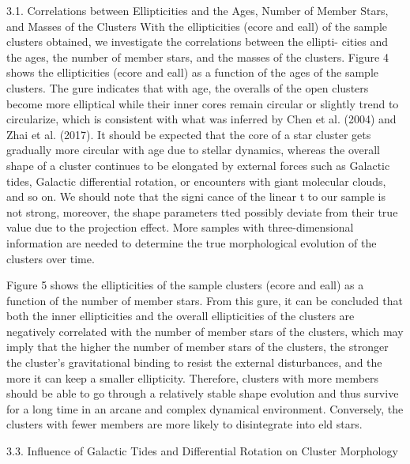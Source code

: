 \documentclass[../main.tex]{subfiles}
\begin{document}
{3.1. Correlations between Ellipticities and the Ages, Number of
Member Stars, and Masses of the Clusters
With the ellipticities (ecore and eall) of the sample clusters
obtained, we investigate the correlations between the ellipti-
cities and the ages, the number of member stars, and the masses
of the clusters. Figure 4 shows the ellipticities (ecore and eall) as
a function of the ages of the sample clusters. The gure
indicates that with age, the overalls of the open clusters become
more elliptical while their inner cores remain circular or
slightly trend to circularize, which is consistent with what was
inferred by Chen et al. (2004) and Zhai et al. (2017). It should
be expected that the core of a star cluster gets gradually more
circular with age due to stellar dynamics, whereas the overall
shape of a cluster continues to be elongated by external forces
such as Galactic tides, Galactic differential rotation, or
encounters with giant molecular clouds, and so on. We should
note that the signi cance of the linear t to our sample is not
strong, moreover, the shape parameters tted possibly deviate
from their true value due to the projection effect. More samples
with three-dimensional information are needed to determine the
true morphological evolution of the clusters over time.

Figure 5 shows the ellipticities of the sample clusters (ecore
and eall) as a function of the number of member stars. From this
gure, it can be concluded that both the inner ellipticities and
the overall ellipticities of the clusters are negatively correlated
with the number of member stars of the clusters, which may
imply that the higher the number of member stars of the
clusters, the stronger the cluster’s gravitational binding to resist
the external disturbances, and the more it can keep a smaller
ellipticity. Therefore, clusters with more members should be
able to go through a relatively stable shape evolution and thus
survive for a long time in an arcane and complex dynamical
environment. Conversely, the clusters with fewer members are
more likely to disintegrate into eld stars.

3.3. Influence of Galactic Tides and Differential Rotation on
Cluster Morphology

}
\end{document}
